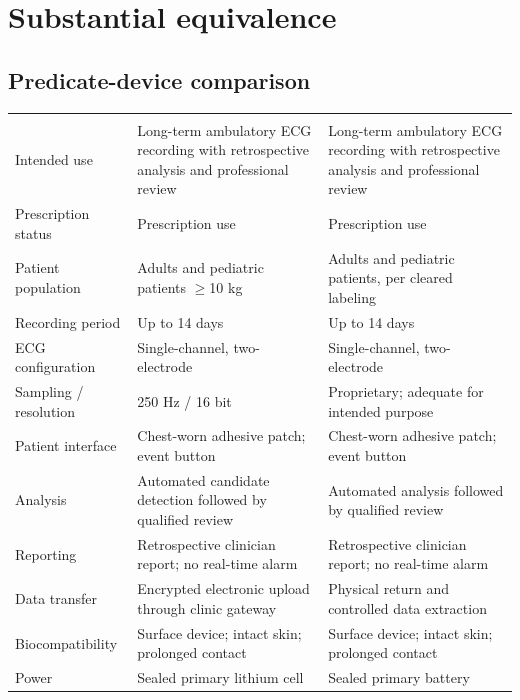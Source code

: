 \section{Substantial equivalence}

\subsection{Predicate-device comparison}
\small
\begin{longtable}{@{}L{1.42in}L{2.48in}L{2.48in}@{}}
\toprule
{}
 &  &  \\
\midrule
\endfirsthead
\toprule
{}
 &  &  \\
\midrule
\endhead
Intended use & Long-term ambulatory ECG recording with retrospective analysis and professional review & Long-term ambulatory ECG recording with retrospective analysis and professional review \\
Prescription status & Prescription use & Prescription use \\
Patient population & Adults and pediatric patients $\geq$10 kg & Adults and pediatric patients, per cleared labeling \\
Recording period & Up to 14 days & Up to 14 days \\
ECG configuration & Single-channel, two-electrode & Single-channel, two-electrode \\
Sampling / resolution & 250 Hz / 16 bit & Proprietary; adequate for intended purpose \\
Patient interface & Chest-worn adhesive patch; event button & Chest-worn adhesive patch; event button \\
Analysis & Automated candidate detection followed by qualified review & Automated analysis followed by qualified review \\
Reporting & Retrospective clinician report; no real-time alarm & Retrospective clinician report; no real-time alarm \\
Data transfer & Encrypted electronic upload through clinic gateway & Physical return and controlled data extraction \\
Biocompatibility & Surface device; intact skin; prolonged contact & Surface device; intact skin; prolonged contact \\
Power & Sealed primary lithium cell & Sealed primary battery \\
\bottomrule
\end{longtable}
\normalsize

